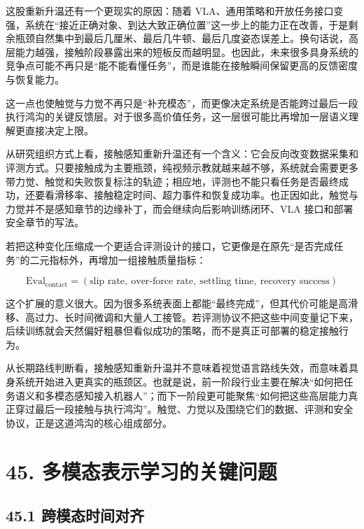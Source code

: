 这股重新升温还有一个更现实的原因：随着 VLA、通用策略和开放任务接口变强，系统在“接近正确对象、到达大致正确位置”这一步上的能力正在改善，于是剩余瓶颈自然集中到最后几厘米、最后几牛顿、最后几度姿态误差上。换句话说，高层能力越强，接触阶段暴露出来的短板反而越明显。也因此，未来很多具身系统的竞争点可能不再只是“能不能看懂任务”，而是谁能在接触瞬间保留更高的反馈密度与恢复能力。

这一点也使触觉与力觉不再只是“补充模态”，而更像决定系统是否能跨过最后一段执行鸿沟的关键反馈层。对于很多高价值任务，这一层很可能比再增加一层语义理解更直接决定上限。

从研究组织方式上看，接触感知重新升温还有一个含义：它会反向改变数据采集和评测方式。只要接触成为主要瓶颈，纯视频示教就越来越不够，系统就会需要更多带力觉、触觉和失败恢复标注的轨迹；相应地，评测也不能只看任务是否最终成功，还要看滑移率、接触稳定时间、超力事件和恢复成功率。也正因如此，触觉与力觉并不是感知章节的边缘补丁，而会继续向后影响训练闭环、VLA 接口和部署安全章节的写法。

若把这种变化压缩成一个更适合评测设计的接口，它更像是在原先“是否完成任务”的二元指标外，再增加一组接触质量指标：

\begingroup
\scriptsize
\begin{equation*}
\text{Eval}_{\text{contact}}
=
(\text{slip rate},\ \text{over-force rate},\ \text{settling time},\ \text{recovery success})
\end{equation*}
\endgroup

这个扩展的意义很大。因为很多系统表面上都能“最终完成”，但其代价可能是高滑移、高过力、长时间微调和大量人工接管。若评测协议不把这些中间变量记下来，后续训练就会天然偏好粗暴但看似成功的策略，而不是真正可部署的稳定接触行为。

从长期路线判断看，接触感知重新升温并不意味着视觉语言路线失效，而意味着具身系统开始进入更真实的瓶颈区。也就是说，前一阶段行业主要在解决“如何把任务语义和多模态感知接入机器人”；而下一阶段更可能聚焦“如何把这些高层能力真正穿过最后一段接触与执行鸿沟”。触觉、力觉以及围绕它们的数据、评测和安全协议，正是这道鸿沟的核心组成部分。

\section*{45. 多模态表示学习的关键问题}

\subsection*{45.1 跨模态时间对齐}


